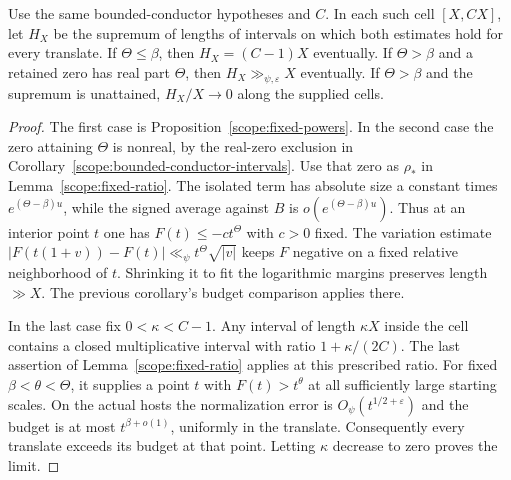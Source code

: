 \begin{corollary}
\label{scope:relative-length}
Use the same bounded-conductor hypotheses and \(C\). In each such
cell \([X,CX]\), let \(H_X\) be the supremum of lengths of intervals
on which both estimates hold for every translate. If
\(\Theta\le\beta\), then \(H_X=(C-1)X\) eventually. If
\(\Theta>\beta\) and a retained zero has real part \(\Theta\), then
\(H_X\gg_{\psi,\varepsilon}X\) eventually. If \(\Theta>\beta\) and
the supremum is unattained, \(H_X/X\to0\) along the supplied cells.
\end{corollary}
\begin{proof}
The first case is Proposition~\ref{scope:fixed-powers}.
In the second case the zero attaining \(\Theta\) is nonreal, by the
real-zero exclusion in Corollary~\ref{scope:bounded-conductor-intervals}.
Use that zero as \(\rho_*\) in Lemma~\ref{scope:fixed-ratio}.
The isolated term has absolute size a constant times
\(e^{(\Theta-\beta)u}\), while the signed average against \(B\)
is \(o(e^{(\Theta-\beta)u})\). Thus at an interior point \(t\)
one has \(F(t)\le-c t^\Theta\) with \(c>0\) fixed. The variation
estimate \(\lvert F(t(1+v))-F(t)\rvert\ll_\psi t^\Theta\sqrt{|v|}\)
keeps \(F\) negative on a fixed relative neighborhood of \(t\).
Shrinking it to fit the logarithmic margins preserves length
\(\gg X\). The previous corollary's budget comparison applies there.

In the last case fix \(0<\kappa<C-1\). Any interval of length
\(\kappa X\) inside the cell contains a closed multiplicative
interval with ratio \(1+\kappa/(2C)\). The last assertion of
Lemma~\ref{scope:fixed-ratio} applies at this prescribed ratio.
For fixed \(\beta<\theta<\Theta\), it supplies a point \(t\) with
\(F(t)>t^\theta\) at all sufficiently large starting scales.
On the actual hosts the normalization error is
\(O_\psi(t^{1/2+\varepsilon})\) and the budget is at most
\(t^{\beta+o(1)}\), uniformly in the translate. Consequently
every translate exceeds its budget at that point. Letting
\(\kappa\) decrease to zero proves the limit.
\end{proof}
